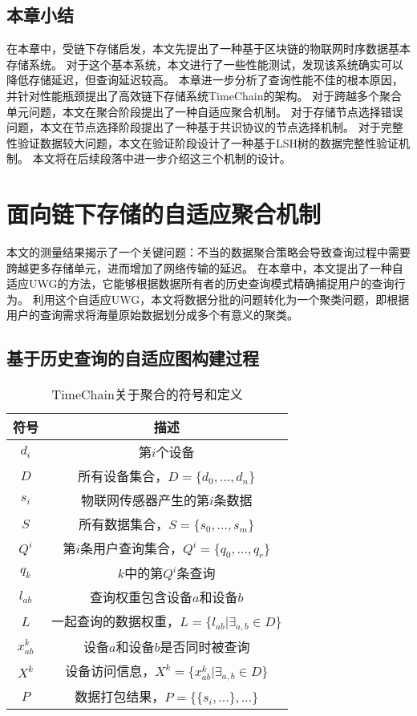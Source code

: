 \section{本章小结}
在本章中，受链下存储启发，本文先提出了一种基于区块链的物联网时序数据基本存储系统。
对于这个基本系统，本文进行了一些性能测试，发现该系统确实可以降低存储延迟，但查询延迟较高。
本章进一步分析了查询性能不佳的根本原因，并针对性能瓶颈提出了高效链下存储系统TimeChain的架构。
对于跨越多个聚合单元问题，本文在聚合阶段提出了一种自适应聚合机制。
对于存储节点选择错误问题，本文在节点选择阶段提出了一种基于共识协议的节点选择机制。
对于完整性验证数据较大问题，本文在验证阶段设计了一种基于LSH树的数据完整性验证机制。
本文将在后续段落中进一步介绍这三个机制的设计。

\chapter{面向链下存储的自适应聚合机制}
\label{sec:packaging}
本文的测量结果揭示了一个关键问题：不当的数据聚合策略会导致查询过程中需要跨越更多存储单元，进而增加了网络传输的延迟。
在本章中，本文提出了一种自适应UWG的方法，它能够根据数据所有者的历史查询模式精确捕捉用户的查询行为。
利用这个自适应UWG，本文将数据分批的问题转化为一个聚类问题，即根据用户的查询需求将海量原始数据划分成多个有意义的聚类。

\section{基于历史查询的自适应图构建过程}
\label{sec:UWG}

\begin{table}
    \centering
    \caption{TimeChain关于聚合的符号和定义}
    \begin{tabular}{|c|c|}
        \hline
        \textbf{符号} & \textbf{描述} \\
        \hline
        $d_i$   & 第$i$个设备 \\
        \hline
        $D$     & 所有设备集合，$D = \{d_0, ..., d_n\}$\\
        \hline
        $s_i$   & 物联网传感器产生的第$i$条数据 \\
        \hline
        $S$     & 所有数据集合，$S = \{s_0, ..., s_m \}$\\
        \hline
        $Q^i$   & 第$i$条用户查询集合，$Q^i = \{ q_0, ..., q_r \}$\\
        \hline
        $q_k$   & $k$中的第$Q^i$条查询 \\
        \hline
        $l_{ab}$& 查询权重包含设备$a$和设备$b$ \\
        \hline
        $L$     & 一起查询的数据权重，$L = \{l_{ab} | \exists_{a,b} \in D \}$\\
        \hline
        $x^k_{ab}$ & 设备$a$和设备$b$是否同时被查询 \\
        \hline
        $X^k$   & 设备访问信息，$X^k = \{x^k_{ab} | \exists_{a,b} \in D \}$\\
        \hline
        $P$     & 数据打包结果，$P = \{ \{ s_i, ... \}, ... \}$\\
        \hline
    \end{tabular}
    \label{tab:notations}
\end{table}

